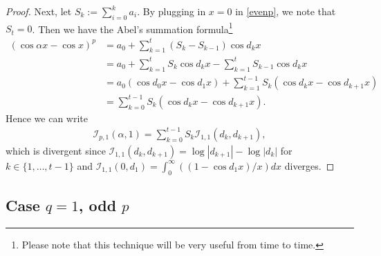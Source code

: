 \documentclass[12pt, reqno]{amsart}
\theoremstyle{plain}
\theoremstyle{definition}
\begin{document}
\begin{proof}

 Next, let $S_k:=\sum_{i=0}^ka_i$. By plugging in $x=0$ in \eqref{evenp}, we note that $S_t= 0$. Then we have the Abel's summation formula\footnote{Please note that this technique will be very useful from time to time.}
        \begin{align*}
            (\cos\alpha x-\cos  x)^p &=a_0+\sum_{k=1}^t(S_k-S_{k-1})\cos d_kx\\
            &=a_0+\sum_{k=1}^tS_k\cos d_kx-\sum_{k=1}^tS_{k-1}\cos d_kx\\
            &=a_0(\cos d_0x-\cos d_1x)+\sum_{k=1}^{t-1}S_k(\cos d_kx-\cos d_{k+1}x)\\
            &=\sum_{k=0}^{t-1}S_k(\cos d_kx-\cos d_{k+1}x).
        \end{align*}
    Hence we can write
    \begin{align*}
        \mathcal{I}_{p, 1}(\alpha, 1)=\sum_{k=0}^{t-1}S_k\mathcal{I}_{1, 1}(d_k, d_{k+1}),
    \end{align*}
    which is divergent since $\mathcal{I}_{1, 1}(d_k, d_{k+1})=\log|d_{k+1}|-\log|d_k|$ for $k\in\{1, \ldots, t-1\}$ and $\mathcal{I}_{1, 1}(0, d_1)=\int_0^{\infty}((1-\cos d_1x)/x)dx$ diverges.
\end{proof}

\subsection{Case $q=1$, odd $p$}
\end{document}
